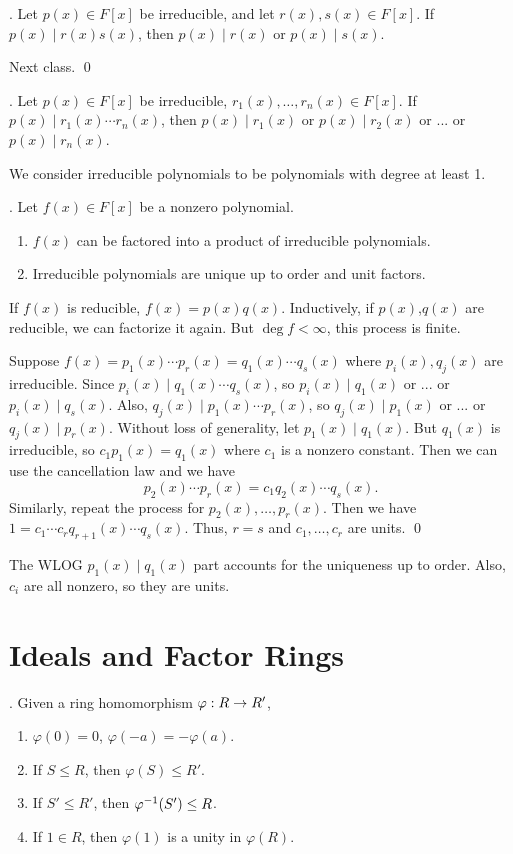 \thm. Let \(p(x) \in F[x]\) be irreducible, and let \(r(x), s(x) \in F[x]\). If \(p(x) \mid r(x)s(x)\), then \(p(x) \mid r(x)\) or \(p(x) \mid s(x)\).

\pf Next class. \qed

\cor. Let \(p(x) \in F[x]\) be irreducible, \(r_1(x), \dots, r_n(x) \in F[x]\). If \(p(x) \mid r_1(x) \cdots r_n(x)\), then \(p(x) \mid r_1(x)\) or \(p(x) \mid r_2(x)\) or ... or \(p(x) \mid r_n(x)\).

We consider irreducible polynomials to be polynomials with degree at least 1.

\thm. Let \(f(x) \in F[x]\) be a nonzero polynomial.
\begin{enumerate}
    \item \(f(x)\) can be factored into a product of irreducible polynomials.
    \item Irreducible polynomials are unique up to order and unit factors.
\end{enumerate}

\pf {} If \(f(x)\) is reducible, \(f(x) = p(x)q(x)\). Inductively, if \(p(x)\),\(q(x)\) are reducible, we can factorize it again. But \(\deg f < \infty\), this process is finite.

 Suppose \(f(x) = p_1(x)\cdots p_r(x) = q_1(x)\cdots q_s(x)\) where \(p_i(x), q_j(x)\) are irreducible. Since \(p_i(x) \mid q_1(x)\cdots q_s(x)\), so \(p_i(x) \mid q_1(x)\) or ... or \(p_i(x) \mid q_s(x)\). Also, \(q_j(x) \mid p_1(x)\cdots p_r(x)\), so \(q_j(x) \mid p_1(x)\) or ... or \(q_j(x) \mid p_r(x)\). Without loss of generality, let \(p_1(x) \mid q_1(x)\). But \(q_1(x)\) is irreducible, so \(c_1 p_1(x) = q_1(x)\) where \(c_1\) is a nonzero constant. Then we can use the cancellation law and we have
\[
    p_2(x) \cdots p_r(x) = c_1 q_2(x)\cdots q_s(x).
\]
Similarly, repeat the process for \(p_2(x), \dots, p_r(x)\). Then we have \(1 = c_1\cdots c_r q_{r+1}(x)\cdots q_s(x)\). Thus, \(r = s\) and \(c_1, \dots, c_r\) are units. \qed

\rmk The WLOG \(p_1(x) \mid q_1(x)\) part accounts for the uniqueness up to order. Also, \(c_i\) are all nonzero, so they are units.

\chapter{Ideals and Factor Rings}

\setcounter{topic}{25}

\thm. Given a ring homomorphism \(\varphi: R \rightarrow R'\),
\begin{enumerate}
    \item \(\varphi(0) = 0\), \(\varphi(-a) = -\varphi(a)\).
    \item If \(S \leq R\), then \(\varphi(S) \leq R'\).
    \item If \(S' \leq R'\), then \(\varphi^{-1}(S') \leq R\).
    \item If \(1 \in R\), then \(\varphi(1)\) is a unity in \(\varphi(R)\).
\end{enumerate}

